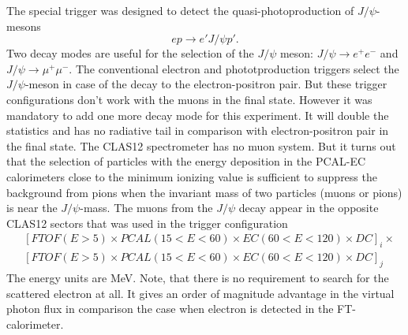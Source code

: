 The special trigger was designed to detect the quasi-photoproduction of $J/\psi$-mesons
$$
ep \to e' J/\psi p'.
$$
Two decay modes are useful for the selection of the $J/\psi$ meson: $J/\psi \to e^+e^-$ and $J/\psi \to \mu^+\mu^-$.
The conventional electron and phototproduction triggers  select the $J/\psi$-meson  in case of the decay to the electron-positron pair.
But these trigger configurations don't  work  with the muons in the final state. However it was mandatory to add one more decay mode for this experiment. It will double the statistics and has no radiative tail in comparison with electron-positron pair in the final state. The CLAS12 spectrometer has no muon system. But it turns out that the selection of particles with the energy deposition in the
PCAL-EC  calorimeters close to the minimum  ionizing  value is sufficient to suppress the background from pions when the 
invariant mass of two  particles (muons or pions) is near the $J/\psi$-mass. The muons from the $J/\psi$ decay appear in the opposite CLAS12 sectors that was used in the trigger configuration  
\begin{align*} 
 & [FTOF(E{{>}}5){\times}  PCAL(15{<}E{<}60){\times} EC(60{<}E{<}120){\times}   DC]_i {\times} \\
 & [FTOF(E{{>}}5){\times}  PCAL(15{<}E{<}60){\times} EC(60{<}E{<}120){\times}   DC]_j  
\end{align*}
\noindent
The energy units are MeV. Note, that there is no requirement to search for the scattered electron at all. It gives an order of magnitude advantage in the  virtual photon flux in comparison the case when electron is detected in the FT-calorimeter.




